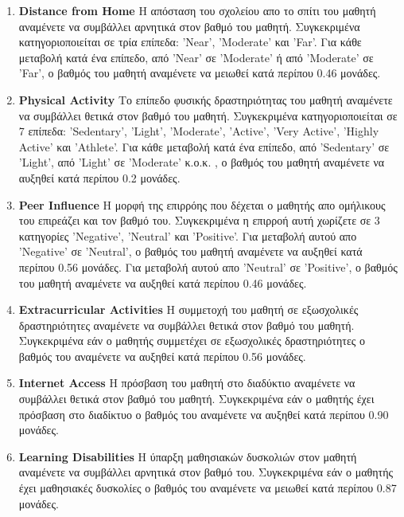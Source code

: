 \documentclass[12pt]{article}
\begin{document}
\begin{enumerate}
 \item \textbf{Distance from Home} Η απόσταση του σχολείου απο το σπίτι του μαθητή αναμένετε να συμβάλλει
 αρνητικά στον βαθμό του μαθητή. Συγκεκριμένα κατηγοριοποιείται σε τρία επίπεδα: ’Near’,
 ’Moderate’ και ’Far’. Για κάθε μεταβολή κατά ένα επίπεδο, από ’Near’ σε ’Moderate’ ή από
 ’Moderate’ σε ’Far’, ο βαθμός του μαθητή αναμένετε να μειωθεί κατά περίπου 0.46 μονάδες.
 
 \item \textbf{Physical Activity} Το επίπεδο φυσικής δραστηριότητας του μαθητή αναμένετε να συμβάλλει θετικά
 στον βαθμό του μαθητή. Συγκεκριμένα κατηγοριοποιείται σε 7 επίπεδα: ’Sedentary’, ’Light’,
 ’Moderate’, ’Active’, ’Very Active’, ’Highly Active’ και ’Athlete’. Για κάθε μεταβολή κατά ένα
 επίπεδο, από ’Sedentary’ σε ’Light’, από ’Light’ σε ’Moderate’ κ.ο.κ. , ο βαθμός του μαθητή
 αναμένετε να αυξηθεί κατά περίπου 0.2 μονάδες.

 \item \textbf{Peer Influence}  Η μορφή της επιρρόης που δέχεται ο μαθητής απο ομήλικους του επιρεάζει και
 τον βαθμό του. Συγκεκριμένα η επιρροή αυτή χωρίζετε σε 3 κατηγορίες ’Negative’, ’Neutral’ και
 ’Positive’. Για μεταβολή αυτού απο ’Negative’ σε ’Neutral’, ο βαθμός του μαθητή αναμένετε να
 αυξηθεί κατά περίπου 0.56 μονάδες. Για μεταβολή αυτού απο ’Neutral’ σε ’Positive’, ο βαθμός
 του μαθητή αναμένετε να αυξηθεί κατά περίπου 0.46 μονάδες.
    
    \item \textbf{Extracurricular Activities}  Η συμμετοχή του μαθητή σε εξωσχολικές δραστηριότητες αναμένετε
 να συμβάλλει θετικά στον βαθμό του μαθητή. Συγκεκριμένα εάν ο μαθητής συμμετέχει σε εξωσχολικές
 δραστηριότητες ο βαθμός του αναμένετε να αυξηθεί κατά περίπου 0.56 μονάδες.
 
 \item \textbf{Internet Access}  Η πρόσβαση του μαθητή στο διαδύκτιο αναμένετε να συμβάλλει θετικά στον
 βαθμό του μαθητή. Συγκεκριμένα εάν ο μαθητής έχει πρόσβαση στο διαδίκτυο ο βαθμός του
 αναμένετε να αυξηθεί κατά περίπου 0.90 μονάδες.
 
 \item \textbf{Learning Disabilities} Η ύπαρξη μαθησιακών δυσκολιών στον μαθητή αναμένετε να συμβάλλει
 αρνητικά στον βαθμό του. Συγκεκριμένα εάν ο μαθητής έχει μαθησιακές δυσκολίες ο βαθμός του
 αναμένετε να μειωθεί κατά περίπου 0.87 μονάδες.\\
\end{enumerate}
\end{document}
